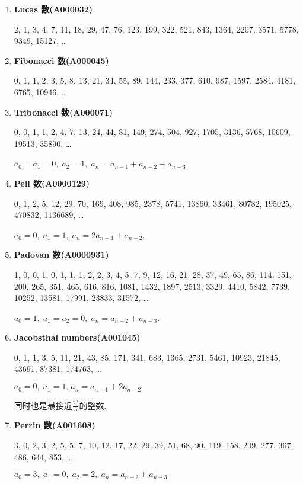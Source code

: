 \begin{enumerate}
    \item \textbf{Lucas 数(A000032)}
          
          2, 1, 3, 4, 7, 11, 18, 29, 47, 76, 123, 199, 322, 521, 843, 1364, 2207, 3571, 5778, 9349, 15127, \dots
          
    \item \textbf{Fibonacci 数(A000045)}
          
          0, 1, 1, 2, 3, 5, 8, 13, 21, 34, 55, 89, 144, 233, 377, 610, 987, 1597, 2584, 4181, 6765, 10946, \dots
          
    \item \textbf{Tribonacci 数(A000071)}
          
          0, 0, 1, 1, 2, 4, 7, 13, 24, 44, 81, 149, 274, 504, 927, 1705, 3136, 5768, 10609, 19513, 35890, \dots
          
          \( a_0 = a_1 = 0,\; a_2 = 1,\; a_n = a_{n - 1} + a_{n - 2} + a_{n - 3} \).
          
    \item \textbf{Pell 数(A0000129)}
          
          0, 1, 2, 5, 12, 29, 70, 169, 408, 985, 2378, 5741, 13860, 33461, 80782, 195025, 470832, 1136689, \dots
          
          \( a_0 = 0,\; a_1 = 1,\; a_n = 2a_{n - 1} + a_{n - 2} \).
          
    \item \textbf{Padovan 数(A0000931)}
          
          1, 0, 0, 1, 0, 1, 1, 1, 2, 2, 3, 4, 5, 7, 9, 12, 16, 21, 28, 37, 49, 65, 86, 114, 151, 200, 265, 351, 465, 616, 816, 1081, 1432, 1897, 2513, 3329, 4410, 5842, 7739, 10252, 13581, 17991, 23833, 31572, \dots
          
          \(a_0 = 1,\; a_1 = a_2 = 0,\; a_n = a_{n - 2} + a_{n - 3}\).
          
    \item \textbf{Jacobsthal numbers(A001045)}
          
          0, 1, 1, 3, 5, 11, 21, 43, 85, 171, 341, 683, 1365, 2731, 5461, 10923, 21845, 43691, 87381, 174763, \dots
          
          \( a_0 = 0,\; a_1 = 1.\; a_n = a_{n - 1} + 2a_{n - 2} \)
          
          同时也是最接近\(\frac {2 ^ n} 3\)的整数.
          
    \item \textbf{Perrin 数(A001608)}
          
          3, 0, 2, 3, 2, 5, 5, 7, 10, 12, 17, 22, 29, 39, 51, 68, 90, 119, 158, 209, 277, 367, 486, 644, 853, \dots
          
          \( a_0 = 3,\; a_1 = 0,\; a_2 = 2,\; a_n = a_{n - 2} + a_{n - 3} \)
\end{enumerate}

